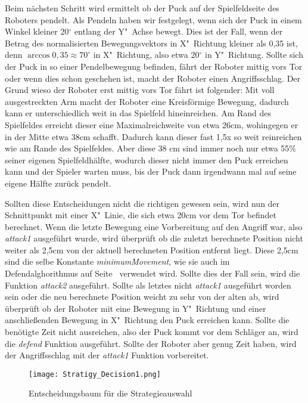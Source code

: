 Beim nächsten Schritt wird ermittelt ob der Puck auf der Spielfeldseite des Roboters pendelt. Als Pendeln haben wir festgelegt, wenn sich der Puck in einem Winkel kleiner 20$^\circ$ entlang der Y"~Achse bewegt. Dies ist der Fall, wenn der Betrag des normalisierten Bewegungsvektors in X"~Richtung kleiner als 0,35 ist, denn $\arccos 0,35 \approx 70^\circ$ in X"~Richtung, also etwa 20$^\circ$ in Y"~Richtung. Sollte sich der Puck in so einer Pendelbewegung befinden, fährt der Roboter mittig vors Tor oder wenn dies schon geschehen ist, macht der Roboter einen Angriffsschlag. Der Grund wieso der Roboter erst mittig vors Tor fährt ist folgender: Mit voll ausgestreckten Arm macht der Roboter eine Kreisförmige Bewegung, dadurch kann er unterschiedlich weit in das Spielfeld hineinreichen. Am Rand des Spielfeldes erreicht dieser eine Maximalreichweite von etwa 26cm, wohingegen er in der Mitte etwa 38cm schafft. Dadurch kann dieser fast 1,5x so weit reinreichen wie am Rande des Spielfeldes.
Aber diese 38 cm sind immer noch nur etwa 55\% seiner eigenen Spielfeldhälfte, wodurch dieser nicht immer den Puck erreichen kann und der Spieler warten muss, bis der Puck dann irgendwann mal auf seine eigene Hälfte zurück pendelt.

Sollten diese Entscheidungen nicht die richtigen gewesen sein, wird nun der Schnittpunkt mit einer X"~Linie, die sich etwa 20cm vor dem Tor befindet berechnet. Wenn die letzte Bewegung eine Vorbereitung auf den Angriff war, also \textit{attack1} ausgeführt wurde, wird überprüft ob die zuletzt berechnete Position nicht weiter als 2,5cm von der aktuell berechneten Position entfernt liegt. Diese 2,5cm sind die selbe Konstante \textit{minimumMovement}, wie sie auch im Defendalghorithmus auf Seite~\pageref{lst:defensivstrategie} verwendet wird. Sollte dies der Fall sein, wird die Funktion \textit{attack2} ausgeführt. Sollte als letztes nicht \textit{attack1} ausgeführt worden sein oder die neu berechnete Position weicht zu sehr von der alten ab, wird überprüft ob der Roboter mit eine Bewegung in Y"~Richtung und einer anschließenden Bewegung in X"~Richtung den Puck erreichen kann. Sollte die benötigte Zeit nicht ausreichen, also der Puck kommt vor dem Schläger an, wird die \textit{defend} Funktion ausgeführt. Sollte der Roboter aber genug Zeit haben, wird der Angriffsschlag mit der \textit{attack1} Funktion vorbereitet.

\begin{figure}[htbp]
	\texttt{[image: Stratigy\_Decision1.png]}
	\caption{Entscheidungsbaum für die Strategieauswahl}
	\label{img:Entscheidungsbaum Strategieauswahl}
\end{figure}